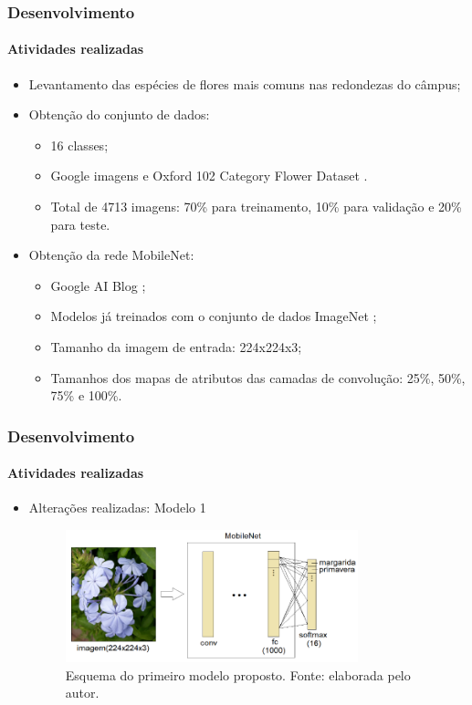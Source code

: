 \documentclass{beamer}
\begin{document}
    
    \begin{frame}
      \frametitle{Desenvolvimento}
      \framesubtitle{Atividades realizadas}      
      \begin{itemize}
        \item<1-> Levantamento das espécies de flores mais comuns nas redondezas do câmpus;\medskip
	    \item<2-> Obtenção do conjunto de dados:
	    		\begin{itemize}
	    			\item<3-> 16 classes;
	    			\item<4-> Google imagens e Oxford 102 Category Flower Dataset \cite{oxford}.
	    			\item<5-> Total de 4713 imagens: 70\% para treinamento, 10\% para validação e 20\% para teste. \medskip
	    		\end{itemize}
        \item<6-> Obtenção da rede MobileNet: 
        		\begin{itemize}
	    			\item<7-> Google AI Blog \cite{googleaiblog};
	    			\item<7-> Modelos já treinados com o conjunto de dados ImageNet \cite{imagenet}; 
				\item<8-> Tamanho da imagem de entrada: 224x224x3;
				\item<8-> Tamanhos dos mapas de atributos das camadas de convolução: 25\%, 50\%, 75\% e 100\%.\medskip    		
	    		\end{itemize}     
      \end{itemize}
    \end{frame}
    
     \begin{frame}
      \frametitle{Desenvolvimento}
      \framesubtitle{Atividades realizadas}      
      \begin{itemize}
        \item<1-> Alterações realizadas: Modelo 1
        		 \begin{figure}[hbt]
      		 	\begin{center}
      				\includegraphics[width=0.8\textwidth]{img/model1.png}
      			\end{center}
      			\caption{Esquema do primeiro modelo proposto. Fonte: elaborada pelo autor.}
      		\end{figure}
      \end{itemize}
    \end{frame}
    
\end{document}
